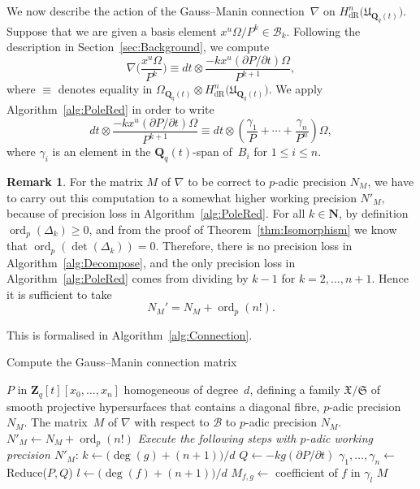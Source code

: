 \documentclass[a4paper,11pt]{article}
\numberwithin{equation}{section}
\newcommand{\NN}{\mathbf{N}} %
\newcommand{\ZZ}{\mathbf{Z}} %
\newcommand{\QQ}{\mathbf{Q}} %
\DeclareMathOperator{\ord}{ord}          %
\providecommand{\HdR}{H_{\text{dR}}}    %
\providecommand{\cB}{\mathcal{B}} %
\theoremstyle{definition}
\newtheorem{rem}[thm]{Remark}
\begin{document}
We now describe the action of the Gauss--Manin connection~$\nabla$ on 
$\HdR^n\bigl(\mathfrak{U}_{\QQ_q(t)}\bigr)$.  Suppose that we are given a basis element 
$x^u \Omega / P^k \in \cB_k$.  Following the description in 
Section~\ref{sec:Background}, we compute
\begin{equation} \label{eqn:nabla}
\nabla \biggl(\frac{x^u \Omega}{P^k}\biggr) \equiv 
    dt \otimes \frac{- k x^u (\partial P / \partial t) \Omega}{P^{k+1}},
\end{equation}
where $\equiv$ denotes equality in 
$\Omega_{\QQ_q(t)} \otimes \HdR^n\bigl(\mathfrak{U}_{\QQ_q(t)}\bigr)$. 
We apply Algorithm~\ref{alg:PoleRed} in order to write
\begin{equation}
dt \otimes \frac{- k x^u (\partial P / \partial t) \Omega}{P^{k+1}} \equiv 
dt \otimes \left( \frac{\gamma_{1}}{P} + \dotsb + \frac{\gamma_n}{P^n} \right) \Omega,
\end{equation}
where $\gamma_i$ is an element in the $\QQ_q(t)$-span of~$B_i$ for $1 \leq i \leq n$. 

\begin{rem} \label{rem:precgm}
For the matrix $M$ of $\nabla$ to be correct to $p$-adic precision $N_M$, we have to 
carry out this computation to a somewhat higher working precision $N'_M$, because of 
precision loss in Algorithm~\ref{alg:PoleRed}. 
For all $k \in \NN$, by definition $\ord_p(\Delta_k) \geq 0$, and from the proof
of Theorem~\ref{thm:Isomorphism} we know that $\ord_p(\det(\Delta_k))=0$. 
Therefore, there is no precision loss 
in Algorithm~\ref{alg:Decompose}, and the only precision loss in Algorithm~\ref{alg:PoleRed} 
comes from dividing by $k-1$ for $k=2,\dotsc,n+1$. Hence it is sufficient to take 
\begin{equation*}
N_M'=N_M + \ord_p(n!).
\end{equation*}
\end{rem}
This is formalised in Algorithm~\ref{alg:Connection}.

\begin{algorithm}
\caption{Compute the Gauss--Manin connection matrix}
\label{alg:Connection}
\begin{algorithmic}
\Require $P$ in $\ZZ_q[t][x_0, \dotsc, x_n]$ homogeneous of degree~$d$, 
         defining a family $\mathfrak{X}/\mathfrak{S}$ of smooth projective 
         hypersurfaces that contains a diagonal fibre, $p$-adic precision $N_M$.
\Ensure  The matrix~$M$ of $\nabla$ with respect to $\cB$ to $p$-adic precision $N_M$.
\State $N'_M \gets N_M + \ord_p(n!)$
\State \textit{Execute the following steps with $p$-adic working precision $N'_M$}:
\State $k \gets  \bigl(\deg(g)+(n+1)\bigr)/d$
\State $Q \gets  - k g (\partial P / \partial t)$
\State $\gamma_{1}, \dotsc, \gamma_n \gets$ {\sc Reduce($P,Q$)} 
\State $l \gets \bigl(\deg(f)+(n+1)\bigr)/d$
\State $M_{f,g} \gets$ coefficient of $f$ in $\gamma_l$
\EndFor
\EndFor
\Return $M$
\EndProcedure
\end{algorithmic}
\end{algorithm}
\end{document}
